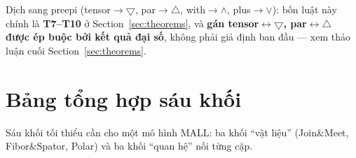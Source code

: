 \documentclass[11pt]{article}
\theoremstyle{plainlabel}
\begin{document}
Dịch sang preepi (tensor$\to\bigtriangledown$, par$\to\triangle$, with$\to\wedge$, plus$\to\vee$): bốn luật này chính là \textbf{T7--T10} ở Section~\ref{sec:theorems}, và \textbf{gán tensor$\leftrightarrow\bigtriangledown$, par$\leftrightarrow\triangle$ được ép buộc bởi kết quả đại số}, không phải giả định ban đầu — xem thảo luận cuối Section~\ref{sec:theorems}.

\section{Bảng tổng hợp sáu khối}

Sáu khối tối thiểu cần cho một mô hình MALL: ba khối ``vật liệu'' (Join\&Meet, Fibor\&Spator, Polar) và ba khối ``quan hệ'' nối từng cặp.
\end{document}
